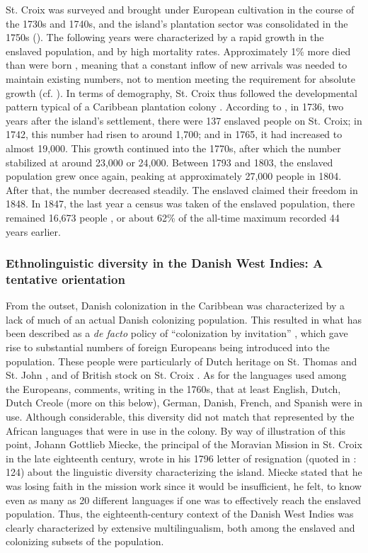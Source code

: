 \documentclass[output=paper,colorlinks,citecolor=brown]{langscibook}
\begin{document}
St. Croix was surveyed and brought under European cultivation in the course of the 1730s and 1740s, and the island’s plantation sector was consolidated in the 1750s (\cite{Hopkins_1987}). The following years were characterized by a rapid growth in the enslaved population, and by high mortality rates. Approximately 1\% more died than were born \citep[150]{Simonsen_Olsen_2017}, meaning that a constant inflow of new arrivals was needed to maintain existing numbers, not to mention meeting the requirement for absolute growth (cf. \cite{Robertsetal_2024}). In terms of demography, St. Croix thus followed the developmental pattern typical of a Caribbean plantation colony \citep[cf.][130]{Higman_2011}. According to \citet[150--151]{Simonsen_Olsen_2017}, in 1736, two years after the island’s settlement, there were 137 enslaved people on St. Croix; in 1742, this number had risen to around 1,700; and in 1765, it had increased to almost 19,000. This growth continued into the 1770s, after which the number stabilized at around 23,000 or 24,000. Between 1793 and 1803, the enslaved population grew once again, peaking at approximately 27,000 people in 1804. After that, the number decreased steadily. The enslaved claimed their freedom in 1848. In 1847, the last year a census was taken of the enslaved population, there remained 16,673 people \citep[33]{Holsoe_1994}, or about 62\% of the all-time maximum recorded 44 years earlier.

\subsubsection{Ethnolinguistic diversity in the Danish West Indies: A tentative orientation}

From the outset, Danish colonization in the Caribbean was characterized by a lack of much of an actual Danish colonizing population. This resulted in what has been described as a \emph{de facto} policy of “colonization by invitation” \citep[6]{Hall_1992}, which gave rise to substantial numbers of foreign Europeans being introduced into the population. These people were particularly of Dutch heritage on St. Thomas and St. John \citep[51]{Arends_Muysken_1992}, and of British stock on St. Croix \citep[13]{Hall_1992}. As for the languages used among the Europeans, \citet[357]{Oldendorp_2000} comments, writing in the 1760s, that at least English, Dutch, Dutch Creole (more on this below), German, Danish, French, and Spanish were in use. Although considerable, this diversity did not match that represented by the African languages that were in use in the colony. By way of illustration of this point, Johann Gottlieb Miecke, the principal of the Moravian Mission in St. Croix in the late eighteenth century, wrote in his 1796 letter of resignation (quoted in \cite{Lawaetz_1902}: 124) about the linguistic diversity characterizing the island. Miecke stated that he was losing faith in the mission work since it would be insufficient, he felt, to know even as many as 20 different languages if one was to effectively reach the enslaved population. Thus, the eighteenth-century context of the Danish West Indies was clearly characterized by extensive multilingualism, both among the enslaved and colonizing subsets of the population.
\end{document}
